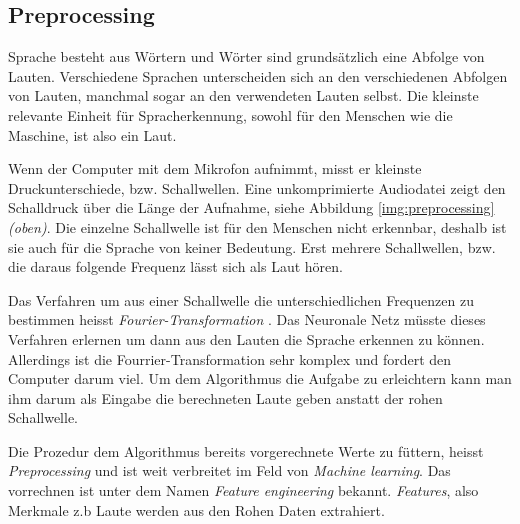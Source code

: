 \subsection{Preprocessing}
Sprache besteht aus Wörtern und Wörter sind grundsätzlich eine Abfolge von Lauten. Verschiedene Sprachen unterscheiden sich an den verschiedenen Abfolgen von Lauten, manchmal sogar an den verwendeten Lauten selbst. Die kleinste relevante Einheit für Spracherkennung, sowohl für den Menschen wie die Maschine, ist also ein Laut.

Wenn der Computer mit dem Mikrofon aufnimmt, misst er kleinste Druckunterschiede, bzw. Schallwellen. Eine unkomprimierte Audiodatei zeigt den Schalldruck über die Länge der Aufnahme, siehe Abbildung \ref{img:preprocessing} \textit{(oben)}.
Die einzelne Schallwelle ist für den Menschen nicht erkennbar, deshalb ist sie auch für die Sprache von keiner Bedeutung. Erst mehrere Schallwellen, bzw. die daraus folgende Frequenz lässt sich als Laut hören. 

Das Verfahren um aus einer Schallwelle die unterschiedlichen Frequenzen zu bestimmen heisst \textit{Fourier-Transformation} \cite{fourrier}. Das Neuronale Netz müsste dieses Verfahren erlernen um dann aus den Lauten die Sprache erkennen zu können. Allerdings ist die Fourrier-Transformation sehr komplex und fordert den Computer darum viel. Um dem Algorithmus die Aufgabe zu erleichtern kann man ihm darum als Eingabe die berechneten Laute geben anstatt der rohen Schallwelle.

Die Prozedur dem Algorithmus bereits vorgerechnete Werte zu füttern, heisst \textit{Preprocessing} und ist weit verbreitet im Feld von \textit{Machine learning}. Das vorrechnen ist unter dem Namen \textit{Feature engineering} bekannt. \textit{Features}, also Merkmale z.b Laute werden aus den Rohen Daten extrahiert. \parencite[vgl.][]{chollet}

